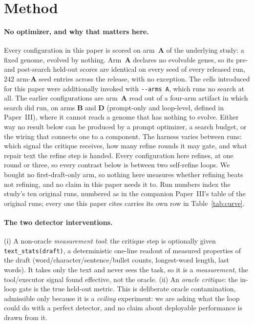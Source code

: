 \documentclass[11pt]{article}
\begin{document}
\section{Method}
\label{sec:method}



\paragraph{No optimizer, and why that matters here.}
Every configuration in this paper is scored on arm~\textbf{A} of the underlying study: a fixed
genome, evolved by nothing. Arm~\textbf{A} declares no evolvable genes, so its pre- and
post-search held-out scores are identical on every seed of every released run, $242$
arm-\textbf{A} seed entries across the release, with no exception. The cells introduced for this
paper were additionally invoked with \texttt{-{}-arms A}, which runs no search at all. The earlier
configurations are arm~\textbf{A} read out of a four-arm artifact in which search did run, on arms
\textbf{B} and \textbf{D} (prompt-only and loop-level, defined in Paper~III), where it cannot
reach a genome that has nothing to evolve. Either way no
result below can be produced by a prompt optimizer, a search budget, or the wiring that connects
one to a component. The harness varies between runs: which signal the critique receives,
how many refine rounds it may gate, and what repair text the refine step is handed.
Every configuration here refines, at one round or three, so every contrast below is between two
self-refine loops. We bought no first-draft-only arm, so nothing here measures whether refining
beats not refining, and no claim in this paper needs it to.
Run numbers index the study's ten original runs, numbered as in the companion Paper~III's
table of the original runs; every one this paper cites carries its own row in
Table~\ref{tab:curve}.

\paragraph{The two detector interventions.}
(i) A non-oracle \emph{measurement tool}: the critique step is optionally given
\texttt{text\_stats(draft)}, a deterministic one-line readout of measured
properties of the draft (word/character/sentence/bullet counts, longest-word
length, last words). It takes only the text and never sees the task, so it is a
\emph{measurement}, the tool/executor signal \citep{huang2023cannot} found
effective, not the oracle. (ii) An \emph{oracle critique}: the in-loop gate is the true
held-out metric. This is deliberate oracle contamination, admissible only because it is a
\emph{ceiling} experiment: we are asking what the loop could do with a perfect detector, and no
claim about deployable performance is drawn from it.
\end{document}

